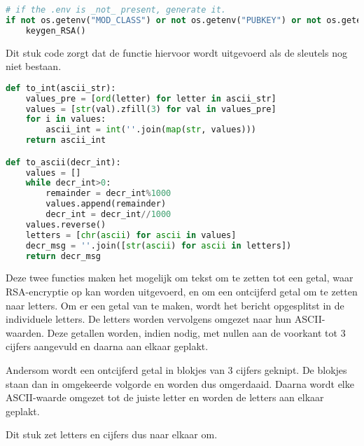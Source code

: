 \documentclass{report} %
\begin{document}
\begin{lstlisting}[language=Python, firstnumber=50]
# if the .env is _not_ present, generate it.
if not os.getenv("MOD_CLASS") or not os.getenv("PUBKEY") or not os.getenv("PRIVKEY"):
    keygen_RSA()
\end{lstlisting}
Dit stuk code zorgt dat de functie hiervoor wordt uitgevoerd als de sleutels nog niet bestaan.\\

\begin{lstlisting}[language=Python, firstnumber=54]
def to_int(ascii_str):
    values_pre = [ord(letter) for letter in ascii_str]
    values = [str(val).zfill(3) for val in values_pre]
    for i in values:
        ascii_int = int(''.join(map(str, values)))
    return ascii_int

def to_ascii(decr_int):
    values = []
    while decr_int>0: 
        remainder = decr_int%1000
        values.append(remainder)
        decr_int = decr_int//1000
    values.reverse()
    letters = [chr(ascii) for ascii in values]
    decr_msg = ''.join([str(ascii) for ascii in letters])
    return decr_msg
\end{lstlisting}
Deze twee functies maken het mogelijk om tekst om te zetten tot een getal, waar RSA-encryptie op kan worden uitgevoerd, en om een ontcijferd getal om te zetten naar letters. Om er een getal van te maken, wordt het bericht opgesplitst in de individuele letters. De letters worden vervolgens omgezet naar hun ASCII-waarden. Deze getallen worden, indien nodig, met nullen aan de voorkant tot 3 cijfers aangevuld en daarna aan elkaar geplakt. 
\par Andersom wordt een ontcijferd getal in blokjes van 3 cijfers geknipt. De blokjes staan dan in omgekeerde volgorde en worden dus omgerdaaid. Daarna wordt elke ASCII-waarde omgezet tot de juiste letter en worden de letters aan elkaar geplakt.
\par Dit stuk zet letters en cijfers dus naar elkaar om.\\
\end{document}
